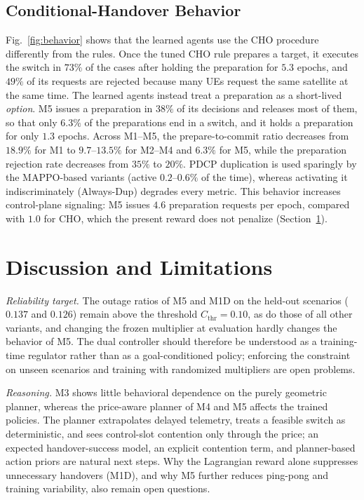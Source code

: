 \documentclass[journal]{IEEEtran}
\begin{document}
\subsection{Conditional-Handover Behavior}
Fig.~\ref{fig:behavior} shows that the learned agents use the CHO procedure
differently from the rules. Once the tuned CHO rule prepares a target, it
executes the switch in $73\%$ of the cases after holding the preparation for
$5.3$ epochs, and $49\%$ of its requests are rejected because many UEs request
the same satellite at the same time. The learned agents instead treat a
preparation as a short-lived \emph{option}. M5 issues a preparation in $38\%$
of its decisions and releases most of them, so that only $6.3\%$ of the
preparations end in a switch, and it holds a preparation for only $1.3$
epochs. Across M1--M5, the prepare-to-commit ratio decreases from $18.9\%$ for M1
to $9.7$--$13.5\%$ for M2--M4 and $6.3\%$ for M5, while the preparation
rejection rate decreases from $35\%$ to $20\%$. PDCP duplication is used sparingly by the MAPPO-based variants (active
$0.2$--$0.6\%$ of the time), whereas activating it indiscriminately
(Always-Dup) degrades every metric. This behavior increases control-plane signaling: M5
issues $4.6$ preparation requests per epoch, compared with $1.0$ for CHO,
which the present reward does not penalize (Section~\ref{sec:limitations}).

\section{Discussion and Limitations}
\label{sec:limitations}

\emph{Reliability target.} The outage ratios of M5 and M1D on the held-out
scenarios ($0.137$ and $0.126$) remain above the threshold
$C_{\mathrm{thr}}=0.10$, as do those of all other variants, and changing the
frozen multiplier at evaluation hardly changes the behavior of M5. The dual
controller should therefore be understood as a training-time regulator rather
than as a goal-conditioned policy; enforcing the constraint on unseen
scenarios and training with randomized multipliers are open problems.

\emph{Reasoning.} M3 shows little behavioral dependence on the purely
geometric planner, whereas the price-aware planner of M4 and M5 affects the
trained policies. The planner extrapolates delayed
telemetry, treats a feasible switch as deterministic, and sees control-slot
contention only through the price; an expected handover-success model, an explicit contention term, and
planner-based action priors are natural next steps. Why the Lagrangian reward
alone suppresses unnecessary handovers (M1D), and why M5 further reduces
ping-pong and training variability, also remain open questions.
\end{document}
